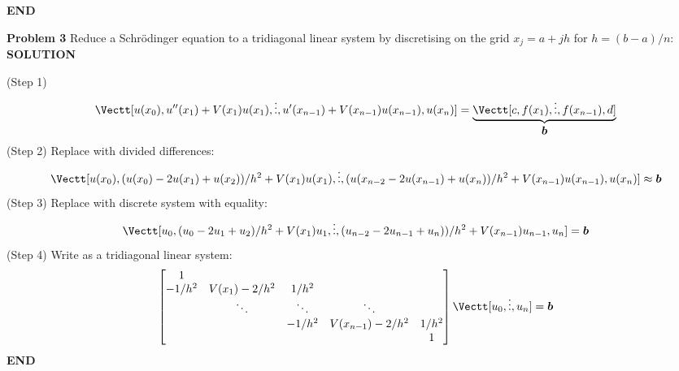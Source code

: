 \documentclass[12pt,a4paper]{article}
\def\b{ {\vc b} }
\begin{document}
\textbf{END}

\textbf{Problem 3} Reduce a Schrödinger equation to a tridiagonal linear system by discretising on the grid $x_j = a + j h$ for $h = (b-a)/n$:
\textbf{SOLUTION}

(Step 1) 
\[
\Vectt[u(x_0), u''(x_1) + V(x_1) u(x_1), \ensuremath{\vdots}, u'(x_{n-1}) + V(x_{n-1}) u(x_{n-1}), u(x_n)] = \underbrace{\Vectt[c, f(x_1),\ensuremath{\vdots},f(x_{n-1}), d]}_{\ensuremath{\bm{\b}}}
\]
(Step 2) Replace with divided differences:
\[
\Vectt[u(x_0), (u(x_0)-2u(x_1)+u(x_2))/h^2 + V(x_1)u(x_1), \ensuremath{\vdots}, (u(x_{n-2} - 2u(x_{n-1})+u(x_n))/h^2 + V(x_{n-1})u(x_{n-1}), u(x_n)] \ensuremath{\approx} \ensuremath{\bm{\b}}
\]
(Step 3) Replace with discrete system with equality:
\[
\Vectt[u_0, (u_0-2u_1+u_2)/h^2 + V(x_1)u_1, \ensuremath{\vdots}, (u_{n-2}-2u_{n-1}+u_n))/h^2+ V(x_{n-1})u_{n-1},u_n] = \ensuremath{\bm{\b}}
\]
(Step 4) Write as a tridiagonal linear system:
\[
\begin{bmatrix}
1 \\
-1/h^2 & V(x_1)-2/h^2 & 1/h^2 \\
& \ensuremath{\ddots} & \ensuremath{\ddots} & \ensuremath{\ddots} \\
&&-1/h^2 & V(x_{n-1})-2/h^2 & 1/h^2 \\
&& &&1
\end{bmatrix} \Vectt[u_0,\ensuremath{\vdots},u_n] = \ensuremath{\bm{\b}}
\]
\textbf{END}
\end{document}
